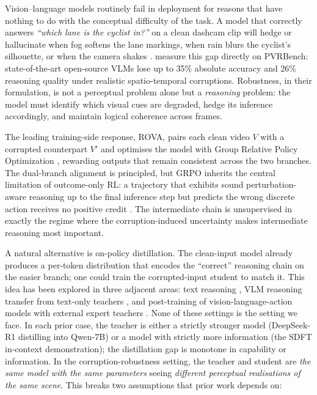 \documentclass{article}
\begin{document}
Vision--language models routinely fail in deployment for reasons that have nothing to do with the conceptual difficulty of the task. A model that correctly answers \emph{``which lane is the cyclist in?''} on a clean dashcam clip will hedge or hallucinate when fog softens the lane markings, when rain blurs the cyclist's silhouette, or when the camera shakes \citep{he2026rova,vlmrobustbench2026}. \citet{he2026rova} measure this gap directly on PVRBench: state-of-the-art open-source VLMs lose up to 35\% absolute accuracy and 26\% reasoning quality under realistic spatio-temporal corruptions. Robustness, in their formulation, is not a perceptual problem alone but a \emph{reasoning} problem: the model must identify which visual cues are degraded, hedge its inference accordingly, and maintain logical coherence across frames.

The leading training-side response, ROVA, pairs each clean video $V$ with a corrupted counterpart $V'$ and optimises the model with Group Relative Policy Optimization \citep{shao2024deepseekmath}, rewarding outputs that remain consistent across the two branches. The dual-branch alignment is principled, but GRPO inherits the central limitation of outcome-only RL: a trajectory that exhibits sound perturbation-aware reasoning up to the final inference step but predicts the wrong discrete action receives no positive credit \citep{lightman2024lets,wang2024mathshepherd}. The intermediate chain is unsupervised in exactly the regime where the corruption-induced uncertainty makes intermediate reasoning most important.

A natural alternative is on-policy distillation. The clean-input model already produces a per-token distribution that encodes the ``correct'' reasoning chain on the easier branch; one could train the corrupted-input student to match it. This idea has been explored in three adjacent areas: text reasoning \citep{gu2024minillm,agarwal2024gkd,ko2024distillm,lu2025onpolicy}, VLM reasoning transfer from text-only teachers \citep{bousselham2025vold}, and post-training of vision-language-action models with external expert teachers \citep{zhong2025vlaopd}. None of these settings is the setting we face. In each prior case, the teacher is either a strictly stronger model (DeepSeek-R1 distilling into Qwen-7B) or a model with strictly more information (the SDFT in-context demonstration); the distillation gap is monotone in capability or information. In the corruption-robustness setting, the teacher and student are \emph{the same model with the same parameters} seeing \emph{different perceptual realisations of the same scene}. This breaks two assumptions that prior work depends on:
\end{document}

